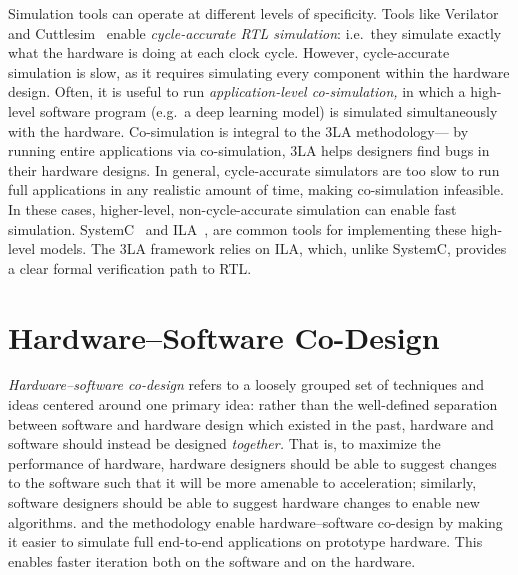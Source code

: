 Simulation tools can operate
  at different levels of specificity.
Tools like Verilator~\cite{verilator} and Cuttlesim~\cite{pitclaudel2021cuttlesim} enable \textit{cycle-accurate RTL simulation}:
  i.e.~they simulate exactly what the hardware
  is doing
  at each clock cycle.
However,
  cycle-accurate simulation is slow,
  as it requires simulating
  every component within the hardware design.
Often, it is useful to run
  \textit{application-level co-simulation,} 
  in which a high-level software program
  (e.g.~a deep learning model)
  is simulated simultaneously with the hardware.
Co-simulation is integral
  to the 3LA methodology---%
  by running entire applications
  via co-simulation, 3LA helps designers
  find bugs in their hardware designs.
In general, cycle-accurate simulators
  are too slow to run full applications
  in any realistic amount of time,
  making co-simulation infeasible.
In these cases,
  higher-level, non-cycle-accurate simulation
  can enable fast simulation.
SystemC~\cite{SystemC}
  and ILA~\cite{todo},
  are common tools for implementing
  these high-level models.
The 3LA framework relies on ILA, which,
  unlike SystemC,
  provides
  a clear formal verification path to RTL.
  
%
  

\section{Hardware--Software Co-Design}

\textit{Hardware--software co-design}
  refers to a loosely grouped
  set of techniques and ideas
  centered around one primary idea:
  rather than the well-defined separation
  between software and hardware design
  which existed in the past,
  hardware and software
  should instead be designed \textit{together.}
That is, to maximize
  the performance of hardware,
  hardware designers should be able to suggest
  changes to the software
  such that it will be more amenable to acceleration;
  similarly,
  software designers should be able to suggest
  hardware changes
  to enable new algorithms.
\g and the 
  \TLA methodology enable
  hardware--software co-design
  by making it easier
  to simulate full end-to-end
  applications
  on prototype hardware.
This enables faster iteration
  both on the software 
  and on the hardware.

